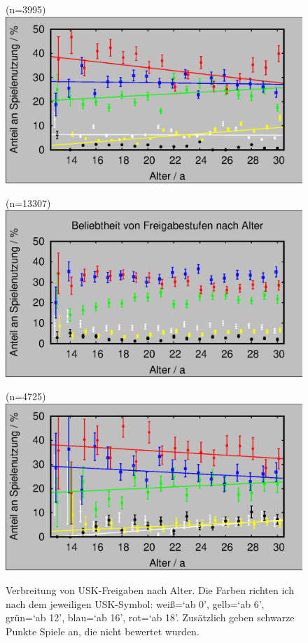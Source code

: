 \documentclass[11pt]{scrartcl}
\begin{document}
\begin{figure}[htb]
	\begin{minipage}[b]{0.3\linewidth}
		 (n=3995)\\
		\includegraphics[width=\linewidth]{2013/freigabe-alter}
	\end{minipage}
	\hfill
	\begin{minipage}[b]{0.3\linewidth}
		 (n=13307)\\
		\includegraphics[width=\linewidth]{2014/freigabe-alter}
	\end{minipage}
	\hfill
	\begin{minipage}[b]{0.3\linewidth}
		 (n=4725)\\
		\includegraphics[width=\linewidth]{2015/freigabe-alter}
	\end{minipage}
	\caption{Verbreitung von USK-Freigaben nach Alter.
	Die Farben richten ich nach dem jeweiligen USK-Symbol:
	weiß=`ab 0', gelb=`ab 6', grün=`ab 12', blau=`ab 16', rot=`ab 18'.
	Zusätzlich geben schwarze Punkte Spiele an, die nicht bewertet wurden.}
	\label{fig: freigabe-alter}
\end{figure}
\end{document}
